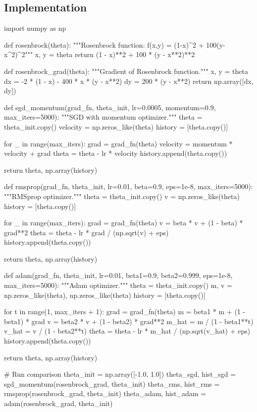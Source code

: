 \documentclass[../../main.tex]{subfiles}
\begin{document}
\subsection{Implementation}

\begin{pythoncode}
import numpy as np

def rosenbrock(theta):
    """Rosenbrock function: f(x,y) = (1-x)^2 + 100(y-x^2)^2"""
    x, y = theta
    return (1 - x)**2 + 100 * (y - x**2)**2

def rosenbrock_grad(theta):
    """Gradient of Rosenbrock function."""
    x, y = theta
    dx = -2 * (1 - x) - 400 * x * (y - x**2)
    dy = 200 * (y - x**2)
    return np.array([dx, dy])

def sgd_momentum(grad_fn, theta_init, lr=0.0005, momentum=0.9, max_iters=5000):
    """SGD with momentum optimizer."""
    theta = theta_init.copy()
    velocity = np.zeros_like(theta)
    history = [theta.copy()]

    for _ in range(max_iters):
        grad = grad_fn(theta)
        velocity = momentum * velocity + grad
        theta = theta - lr * velocity
        history.append(theta.copy())

    return theta, np.array(history)

def rmsprop(grad_fn, theta_init, lr=0.01, beta=0.9, eps=1e-8, max_iters=5000):
    """RMSprop optimizer."""
    theta = theta_init.copy()
    v = np.zeros_like(theta)
    history = [theta.copy()]

    for _ in range(max_iters):
        grad = grad_fn(theta)
        v = beta * v + (1 - beta) * grad**2
        theta = theta - lr * grad / (np.sqrt(v) + eps)
        history.append(theta.copy())

    return theta, np.array(history)

def adam(grad_fn, theta_init, lr=0.01, beta1=0.9, beta2=0.999,
         eps=1e-8, max_iters=5000):
    """Adam optimizer."""
    theta = theta_init.copy()
    m, v = np.zeros_like(theta), np.zeros_like(theta)
    history = [theta.copy()]

    for t in range(1, max_iters + 1):
        grad = grad_fn(theta)
        m = beta1 * m + (1 - beta1) * grad
        v = beta2 * v + (1 - beta2) * grad**2
        m_hat = m / (1 - beta1**t)
        v_hat = v / (1 - beta2**t)
        theta = theta - lr * m_hat / (np.sqrt(v_hat) + eps)
        history.append(theta.copy())

    return theta, np.array(history)

# Run comparison
theta_init = np.array([-1.0, 1.0])
theta_sgd, hist_sgd = sgd_momentum(rosenbrock_grad, theta_init)
theta_rms, hist_rms = rmsprop(rosenbrock_grad, theta_init)
theta_adam, hist_adam = adam(rosenbrock_grad, theta_init)


\end{pythoncode}
\end{document}
